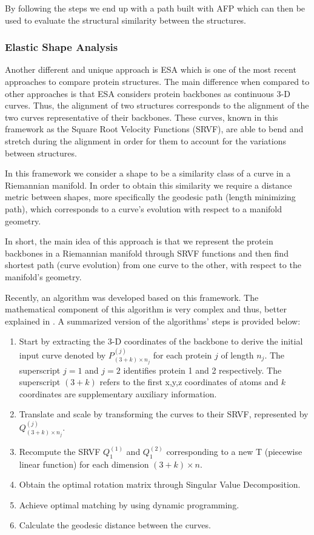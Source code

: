 By following the steps we end up with a path built with AFP which can then be used to evaluate the structural similarity between the structures.

\subsubsection{Elastic Shape Analysis}
Another different and unique approach is ESA \cite{liu2011mathematical} which is one of the most recent approaches to compare protein structures. The main difference when compared to other approaches is that ESA considers protein backbones as continuous 3-D curves. Thus, the alignment of two structures corresponds to the alignment of the two curves representative of their backbones. These curves, known in this framework as the Square Root Velocity Functions (SRVF), are able to bend and stretch during the alignment in order for them to account for the variations between structures.

In this framework we consider a shape to be a similarity class of a curve in a Riemannian manifold. In order to obtain this similarity we require a distance metric between shapes, more specifically the geodesic path (length minimizing path), which corresponds to a curve's evolution with respect to a manifold geometry.

In short, the main idea of this approach is that we represent the protein backbones in a Riemannian manifold through SRVF functions and then find shortest path (curve evolution) from one curve to the other, with respect to the manifold's geometry.

Recently, an algorithm was developed based on this framework. The mathematical component of this algorithm is very complex and thus, better explained in \cite{srivastava2016efficient}. A summarized version of the algorithms' steps is provided below:
\begin{enumerate}
	\item Start by extracting the 3-D coordinates of the backbone to derive the initial input curve denoted by $P_{(3+k)\times n_j}^{(j)}$ for each protein $j$ of length $n_j$. The superscript $j = 1$ and $j = 2$ identifies protein 1 and 2 respectively. The superscript $(3+k)$ refers to the first x,y,z coordinates of atoms and $k$ coordinates are supplementary auxiliary information.
	
	\item Translate and scale by transforming the curves to their SRVF, represented by $Q_{(3+k)\times n_j}^{
		(j)}$.
	
	\item Recompute the SRVF $Q_1^{(1)}$ and $Q_1^{(2)}$ corresponding to a new T (piecewise linear function) for each dimension $(3+k) \times n$.
	
	\item Obtain the optimal rotation matrix through Singular Value Decomposition.
	
	\item Achieve optimal matching by using dynamic programming.
	
	\item Calculate the geodesic distance between the curves.
\end{enumerate}

